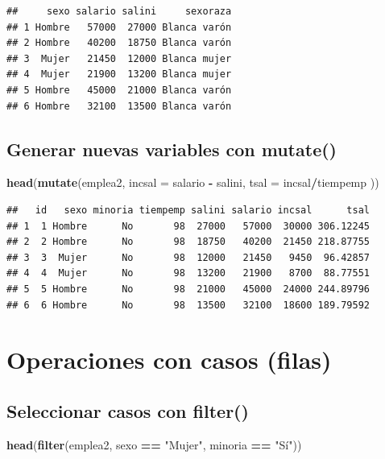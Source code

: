 \documentclass[
]{book}
\newenvironment{Shaded}{\begin{snugshade}}{\end{snugshade}}
\newcommand{\AttributeTok}[1]{\textcolor[rgb]{0.13,0.29,0.53}{#1}}
\newcommand{\FunctionTok}[1]{\textcolor[rgb]{0.13,0.29,0.53}{\textbf{#1}}}
\newcommand{\NormalTok}[1]{#1}
\newcommand{\SpecialCharTok}[1]{\textcolor[rgb]{0.81,0.36,0.00}{\textbf{#1}}}
\newcommand{\StringTok}[1]{\textcolor[rgb]{0.31,0.60,0.02}{#1}}
\begin{document}
\begin{verbatim}
##     sexo salario salini     sexoraza
## 1 Hombre   57000  27000 Blanca varón
## 2 Hombre   40200  18750 Blanca varón
## 3  Mujer   21450  12000 Blanca mujer
## 4  Mujer   21900  13200 Blanca mujer
## 5 Hombre   45000  21000 Blanca varón
## 6 Hombre   32100  13500 Blanca varón
\end{verbatim}

\subsection{\texorpdfstring{Generar nuevas variables con \textbf{mutate()}}{Generar nuevas variables con mutate()}}\label{generar-nuevas-variables-con-mutate}

\begin{Shaded}
\begin{Highlighting}[]
\FunctionTok{head}\NormalTok{(}\FunctionTok{mutate}\NormalTok{(emplea2, }\AttributeTok{incsal =}\NormalTok{ salario }\SpecialCharTok{{-}}\NormalTok{ salini, }\AttributeTok{tsal =}\NormalTok{ incsal}\SpecialCharTok{/}\NormalTok{tiempemp ))}
\end{Highlighting}
\end{Shaded}

\begin{verbatim}
##   id   sexo minoria tiempemp salini salario incsal      tsal
## 1  1 Hombre      No       98  27000   57000  30000 306.12245
## 2  2 Hombre      No       98  18750   40200  21450 218.87755
## 3  3  Mujer      No       98  12000   21450   9450  96.42857
## 4  4  Mujer      No       98  13200   21900   8700  88.77551
## 5  5 Hombre      No       98  21000   45000  24000 244.89796
## 6  6 Hombre      No       98  13500   32100  18600 189.79592
\end{verbatim}

\section{Operaciones con casos (filas)}\label{operaciones-con-casos-filas}

\subsection{\texorpdfstring{Seleccionar casos con \textbf{filter()}}{Seleccionar casos con filter()}}\label{seleccionar-casos-con-filter}

\begin{Shaded}
\begin{Highlighting}[]
\FunctionTok{head}\NormalTok{(}\FunctionTok{filter}\NormalTok{(emplea2, sexo }\SpecialCharTok{==} \StringTok{"Mujer"}\NormalTok{, minoria }\SpecialCharTok{==} \StringTok{"Sí"}\NormalTok{))}
\end{Highlighting}
\end{Shaded}
\end{document}
